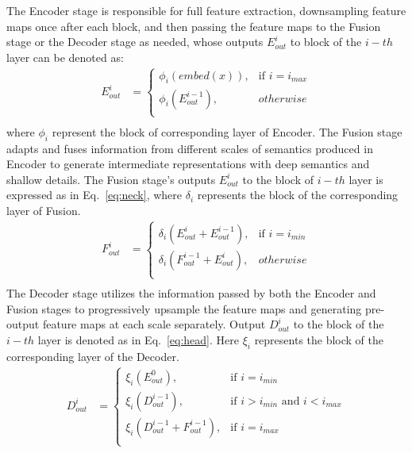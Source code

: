 \documentclass[10pt,twocolumn,letterpaper]{article}
\begin{document}
The Encoder stage is responsible for full feature extraction, downsampling feature maps once after each block, and then passing the feature maps to the Fusion stage or the Decoder stage as needed, whose outputs $E_{out}^i$ to block of the $i-th$ layer can be denoted as:
\begin{equation}
    \begin{aligned}
        E_{out}^{i} &= \left\{
            \begin{array}{lr}
                \phi_{i}\left(embed(x)\right), &\text{if } i=i_{max} \\
                \phi_{i}\left(E_{out}^{i-1}\right), &otherwise \\
            \end{array}
            \right.\\
       \end{aligned}
     \label{eq:backbone}
 \end{equation}
where $\phi_{i}$ represent the block of corresponding layer of Encoder. The Fusion stage adapts and fuses information from different scales of semantics produced in Encoder to generate intermediate representations with deep semantics and shallow details. The Fusion stage's outputs $E_{out}^i$ to the block of $i-th$ layer is expressed as in Eq.~\ref{eq:neck}, where $\delta_{i}$ represents the block of the corresponding layer of  Fusion.
\begin{equation}
   \begin{aligned}
      F_{out}^{i} &= \left\{
         \begin{array}{lr}
            \delta_i\left(E_{out}^{i} + E_{out}^{i-1}\right), &\text{if } i=i_{min} \\
            \delta_i\left(F_{out}^{i-1} + E_{out}^{i}\right), &otherwise \\
         \end{array}
         \right.\\
      \end{aligned}
	\label{eq:neck}
\end{equation}
The Decoder stage utilizes the information passed by both the Encoder and Fusion stages to progressively upsample the feature maps and generating pre-output feature maps at each scale separately. Output $D_{out}^i$ to the block of the $i-th$ layer is denoted as in Eq.~\ref{eq:head}. Here $\xi_{i}$ represents the block of the corresponding layer of the Decoder.
\begin{equation}
   \begin{aligned}
      D_{out}^{i} &= \left\{
         \begin{array}{lc}
            \xi_i\left(E_{out}^{0}\right), &\text{if } i=i_{min}\\
            \xi_i\left(D_{out}^{i-1}\right), &\text{if } i>i_{min}\text{ and }i<i_{max} \\
            \xi_i\left(D_{out}^{i-1} + F_{out}^{i-1}\right), &\text{if } i=i_{max} \\
         \end{array}
         \right.\\
      \end{aligned}
	\label{eq:head}
\end{equation}
\end{document}
